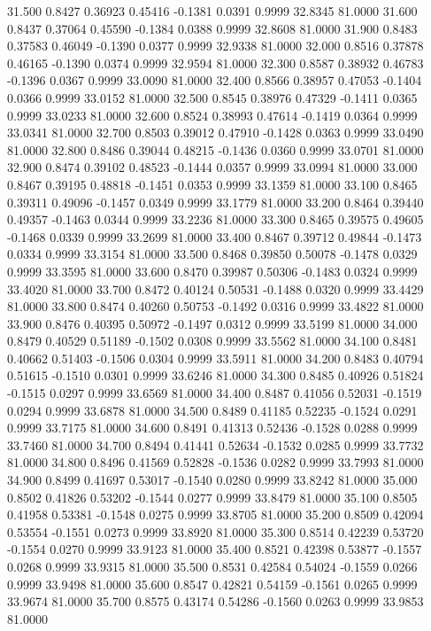   31.500   0.8427   0.36923   0.45416  -0.1381   0.0391   0.9999  32.8345  81.0000
  31.600   0.8437   0.37064   0.45590  -0.1384   0.0388   0.9999  32.8608  81.0000
  31.900   0.8483   0.37583   0.46049  -0.1390   0.0377   0.9999  32.9338  81.0000
  32.000   0.8516   0.37878   0.46165  -0.1390   0.0374   0.9999  32.9594  81.0000
  32.300   0.8587   0.38932   0.46783  -0.1396   0.0367   0.9999  33.0090  81.0000
  32.400   0.8566   0.38957   0.47053  -0.1404   0.0366   0.9999  33.0152  81.0000
  32.500   0.8545   0.38976   0.47329  -0.1411   0.0365   0.9999  33.0233  81.0000
  32.600   0.8524   0.38993   0.47614  -0.1419   0.0364   0.9999  33.0341  81.0000
  32.700   0.8503   0.39012   0.47910  -0.1428   0.0363   0.9999  33.0490  81.0000
  32.800   0.8486   0.39044   0.48215  -0.1436   0.0360   0.9999  33.0701  81.0000
  32.900   0.8474   0.39102   0.48523  -0.1444   0.0357   0.9999  33.0994  81.0000
  33.000   0.8467   0.39195   0.48818  -0.1451   0.0353   0.9999  33.1359  81.0000
  33.100   0.8465   0.39311   0.49096  -0.1457   0.0349   0.9999  33.1779  81.0000
  33.200   0.8464   0.39440   0.49357  -0.1463   0.0344   0.9999  33.2236  81.0000
  33.300   0.8465   0.39575   0.49605  -0.1468   0.0339   0.9999  33.2699  81.0000
  33.400   0.8467   0.39712   0.49844  -0.1473   0.0334   0.9999  33.3154  81.0000
  33.500   0.8468   0.39850   0.50078  -0.1478   0.0329   0.9999  33.3595  81.0000
  33.600   0.8470   0.39987   0.50306  -0.1483   0.0324   0.9999  33.4020  81.0000
  33.700   0.8472   0.40124   0.50531  -0.1488   0.0320   0.9999  33.4429  81.0000
  33.800   0.8474   0.40260   0.50753  -0.1492   0.0316   0.9999  33.4822  81.0000
  33.900   0.8476   0.40395   0.50972  -0.1497   0.0312   0.9999  33.5199  81.0000
  34.000   0.8479   0.40529   0.51189  -0.1502   0.0308   0.9999  33.5562  81.0000
  34.100   0.8481   0.40662   0.51403  -0.1506   0.0304   0.9999  33.5911  81.0000
  34.200   0.8483   0.40794   0.51615  -0.1510   0.0301   0.9999  33.6246  81.0000
  34.300   0.8485   0.40926   0.51824  -0.1515   0.0297   0.9999  33.6569  81.0000
  34.400   0.8487   0.41056   0.52031  -0.1519   0.0294   0.9999  33.6878  81.0000
  34.500   0.8489   0.41185   0.52235  -0.1524   0.0291   0.9999  33.7175  81.0000
  34.600   0.8491   0.41313   0.52436  -0.1528   0.0288   0.9999  33.7460  81.0000
  34.700   0.8494   0.41441   0.52634  -0.1532   0.0285   0.9999  33.7732  81.0000
  34.800   0.8496   0.41569   0.52828  -0.1536   0.0282   0.9999  33.7993  81.0000
  34.900   0.8499   0.41697   0.53017  -0.1540   0.0280   0.9999  33.8242  81.0000
  35.000   0.8502   0.41826   0.53202  -0.1544   0.0277   0.9999  33.8479  81.0000
  35.100   0.8505   0.41958   0.53381  -0.1548   0.0275   0.9999  33.8705  81.0000
  35.200   0.8509   0.42094   0.53554  -0.1551   0.0273   0.9999  33.8920  81.0000
  35.300   0.8514   0.42239   0.53720  -0.1554   0.0270   0.9999  33.9123  81.0000
  35.400   0.8521   0.42398   0.53877  -0.1557   0.0268   0.9999  33.9315  81.0000
  35.500   0.8531   0.42584   0.54024  -0.1559   0.0266   0.9999  33.9498  81.0000
  35.600   0.8547   0.42821   0.54159  -0.1561   0.0265   0.9999  33.9674  81.0000
  35.700   0.8575   0.43174   0.54286  -0.1560   0.0263   0.9999  33.9853  81.0000

